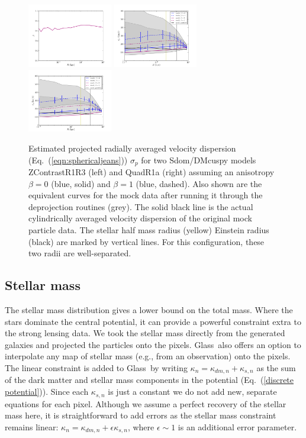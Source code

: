 \documentclass[galley,usenatbib]{mn2e}
\newcommand{\Glass}{{\sc Glass}}
\newcommand{\eqnref}[1] {Eq.~(\ref{#1})}
\begin{document}
\begin{figure}
\includegraphics[width=0.33\textwidth]{BC_beta.pdf}
\includegraphics[width=0.33\textwidth]{BCQuadR1a_Tms_sigp-1.pdf}
\includegraphics[width=0.33\textwidth]{BCQuadR1a_TmS_sigp-2.pdf}
\caption{
  Estimated projected radially averaged velocity dispersion (\eqnref{eqn:sphericaljeans}) $\sigma_p$ for two Sdom/DMcuspy models ZContrastR1R3
  (left) and QuadR1a (right) assuming an anisotropy $\beta=0$ (blue, solid) and $\beta=1$
  (blue, dashed).  Also shown are the equivalent curves for the mock data after
  running it through the deprojection routines (grey). The solid black line is
  the actual cylindrically averaged velocity dispersion of the original mock particle data.
  The stellar half mass radius (yellow) Einstein
radius (black) are marked by vertical lines. For this configuration, these two
radii are well-separated.}
  \label{fig:sigp} \end{figure}

\subsection{Stellar mass}
\label{stellar mass}

The stellar mass distribution gives a lower bound on the total mass. Where the stars dominate the central potential, it can provide a powerful constraint extra to the strong lensing data. We took the stellar mass directly from
the generated galaxies and projected the particles onto the pixels. \Glass\
also offers an option to interpolate any map of stellar mass (e.g., from an
observation) onto the pixels. The linear constraint is added to \Glass\ by
writing $\kappa_n = \kappa_{dm,n} + \kappa_{s,n}$ as the sum of the
dark matter and stellar mass components in the potential (\eqnref{discrete
potential}). Since each $\kappa_{s,n}$ is just a constant we do not add new,
separate equations for each pixel. Although we assume a perfect recovery of the stellar mass here, it is straightforward to add errors as the stellar mass constraint remains linear: $\kappa_n = \kappa_{dm,n} + \epsilon \kappa_{s,n}$, where $\epsilon \sim 1$ is an additional error parameter. 
\end{document}
